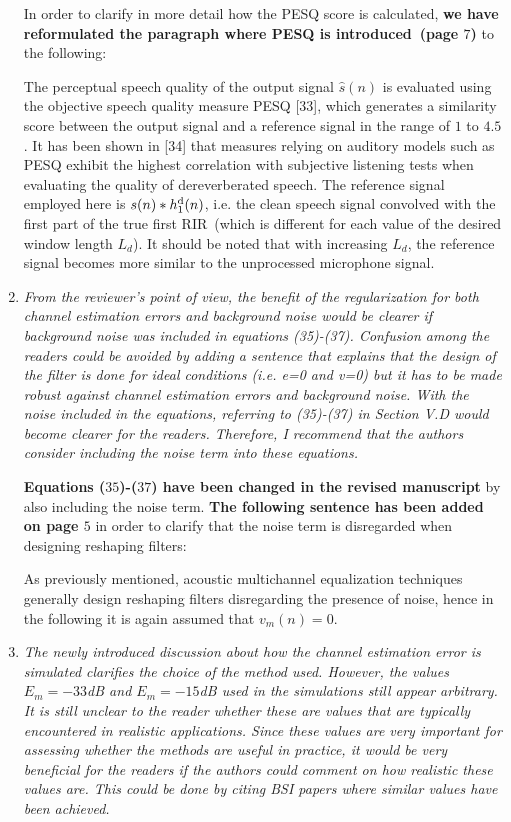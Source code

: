 \documentclass[11pt, a4paper]{article}
\begin{document}
\begin{enumerate}
In order to clarify in more detail how the PESQ score is calculated, {\bf we have reformulated the paragraph where PESQ is introduced~(page $7$)} to the following:

The perceptual speech quality of the output signal $\hat{s}(n)$ is evaluated using the objective speech quality measure PESQ [33], which generates a similarity score between the output signal and a reference signal in the range of $1$ to $4.5$.
It has been shown in [34] that measures relying on auditory models such as PESQ exhibit the highest correlation with subjective listening tests when evaluating the quality of dereverberated speech.
The reference signal employed here is $s(n) \ast h_1^{\rm d}(n)$, i.e. the clean speech signal convolved with the first part of the true first RIR~(which is different for each value of the desired window length $L_d$).
It should be noted that with increasing $L_d$, the reference signal becomes more similar to the unprocessed microphone signal.

\item {\textit{
From the reviewer's point of view, the benefit of the regularization for both channel estimation
errors and background noise would be clearer if background noise was included in equations (35)-(37). Confusion among the readers could be avoided by adding a sentence that explains that the design of the filter is done for ideal conditions (i.e. e=0 and v=0) but it has to be made robust against channel estimation errors and background noise. With the noise included in the equations, referring to (35)-(37) in Section V.D would become clearer for the readers. Therefore, I recommend that the authors consider including the noise term into these equations.
}}

{\bf Equations ($35$)-($37$) have been changed in the revised manuscript} by also including the noise term.
{\bf The following sentence has been added on page $5$} in order to clarify that the noise term is disregarded when designing reshaping filters:

As previously mentioned, acoustic multichannel equalization techniques generally design reshaping filters disregarding the presence of noise, hence in the following it is again assumed that $v_m(n) = 0$.

\item {\textit{
The newly introduced discussion about how the channel estimation error is simulated clarifies the choice of the method used. However, the values $E_m=-33$dB and $E_m=-15$dB used in the simulations still appear arbitrary. It is still unclear to the reader whether these are values that are typically encountered in realistic applications. Since these values are very important for assessing whether the methods are useful in practice, it would be very beneficial for the readers if the authors could comment on how realistic these values are. This could be done by citing BSI papers where
similar values have been achieved.
}}


\end{enumerate}
\end{document}
